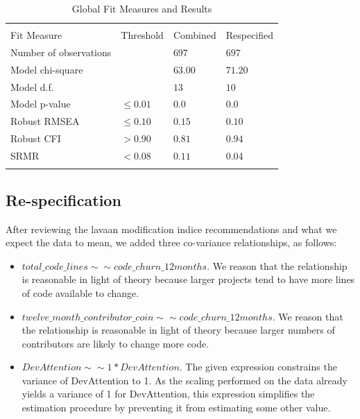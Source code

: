 \begin{table}
	\begin{center}	
		\caption{Global Fit Measures and Results}
			\label{tab:results_fit_combined}
			\begin{tabular}{p{3cm}p{1cm}|p{2cm}p{2cm}}
				\\[-1.8ex]\hline 
				\hline \\[-1.8ex] 
				Fit Measure & Threshold & Combined	& Respecified \\
				Number of observations &  & $697$  & $697$   \\				
				Model chi-square &  & $63.00$ & $71.20$   \\				
				Model d.f. &  & $13$ & $10$   \\		
				Model p-value & $\leq 0.01$ & $0.0$ & $0.0$   \\
				Robust RMSEA & $\leq 0.10$ &  $0.15$ &  $0.10$    \\
				Robust CFI & $> 0.90$ & $0.81$ & $0.94$  \\
				SRMR & $< 0.08$ & $0.11$ & $0.04$  \\
				\hline \\[-1.8ex] 				
			\end{tabular}
	\end{center}
\end{table}

\subsection{Re-specification}
After reviewing the lavaan modification indice recommendations and what we expect the data to mean, we added three co-variance relationships, as follows:
\begin{itemize}
   \item $total\_code\_lines \sim\sim code\_churn\_12months$. We reason that the relationship is reasonable in light of theory because larger projects tend to have more lines of code available to change.
   \item $twelve\_month\_contributor\_coin \sim\sim code\_churn\_12months$. We reason that the relationship is reasonable in light of theory because larger numbers of contributors are likely to change more code.
   \item $DevAttention \sim\sim 1*DevAttention$. The given expression constrains the variance of DevAttention to 1. As the scaling performed on the data already yields a variance of 1 for DevAttention, this expression simplifies the estimation procedure by preventing it from estimating some other value.
\end{itemize}

